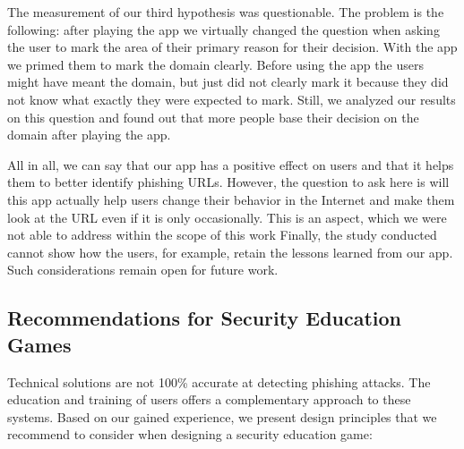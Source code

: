 The measurement of our third hypothesis was questionable.
The problem is the following: after playing the app we virtually changed the question when asking the user to mark the area of their primary reason for their decision.
With the app we primed them to mark the domain clearly.
Before using the app the users might have meant the domain, but just did not clearly mark it because they did not know what exactly they were expected to mark.
Still, we analyzed our results on this question and found out that more people base their decision on the domain after playing the app.

All in all, we can say that our app has a positive effect on users and that it helps them to better identify phishing URLs.
However, the question to ask here is will this app actually help users change their behavior in the Internet and make them look at the URL even if it is only occasionally.
This is an aspect, which we were not able to address within the scope of this work
Finally, the study conducted cannot show how the users, for example, retain the lessons learned from our app.
Such considerations remain open for future work.

\subsection{Recommendations for Security Education Games}
Technical solutions are not 100\% accurate at detecting phishing attacks.
The education and training of users offers a complementary approach to these systems.
Based on our gained experience, we present design principles that we recommend to consider when designing a security education game:

